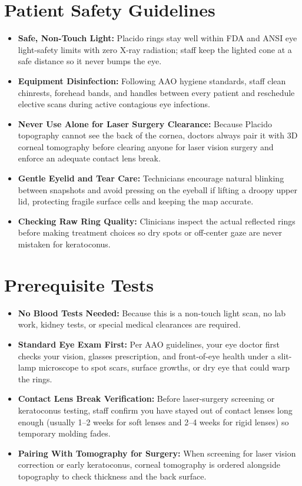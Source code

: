 \section{Patient Safety Guidelines}
\begin{itemize}
    \item \textbf{Safe, Non-Touch Light:} Placido rings stay well within FDA and ANSI eye light-safety limits with zero X-ray radiation; staff keep the lighted cone at a safe distance so it never bumps the eye.
    \item \textbf{Equipment Disinfection:} Following AAO hygiene standards, staff clean chinrests, forehead bands, and handles between every patient and reschedule elective scans during active contagious eye infections.
    \item \textbf{Never Use Alone for Laser Surgery Clearance:} Because Placido topography cannot see the back of the cornea, doctors always pair it with 3D corneal tomography before clearing anyone for laser vision surgery and enforce an adequate contact lens break.
    \item \textbf{Gentle Eyelid and Tear Care:} Technicians encourage natural blinking between snapshots and avoid pressing on the eyeball if lifting a droopy upper lid, protecting fragile surface cells and keeping the map accurate.
    \item \textbf{Checking Raw Ring Quality:} Clinicians inspect the actual reflected rings before making treatment choices so dry spots or off-center gaze are never mistaken for keratoconus.
\end{itemize}

\section{Prerequisite Tests}
\begin{itemize}
    \item \textbf{No Blood Tests Needed:} Because this is a non-touch light scan, no lab work, kidney tests, or special medical clearances are required.
    \item \textbf{Standard Eye Exam First:} Per AAO guidelines, your eye doctor first checks your vision, glasses prescription, and front-of-eye health under a slit-lamp microscope to spot scars, surface growths, or dry eye that could warp the rings.
    \item \textbf{Contact Lens Break Verification:} Before laser-surgery screening or keratoconus testing, staff confirm you have stayed out of contact lenses long enough (usually 1--2 weeks for soft lenses and 2--4 weeks for rigid lenses) so temporary molding fades.
    \item \textbf{Pairing With Tomography for Surgery:} When screening for laser vision correction or early keratoconus, corneal tomography is ordered alongside topography to check thickness and the back surface.
\end{itemize}

